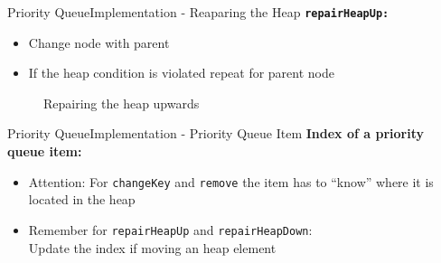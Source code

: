 \begin{frame}{Priority Queue}{Implementation - Reaparing the Heap}
  {\color{Mittel-Blau}\texttt{\textbf{repairHeapUp:}}}
  \begin{itemize}
    \item
      Change node with parent
    \item
      If the {\color{Mittel-Blau}heap condition} is violated repeat for parent
      node
  \end{itemize}
  \begin{center}
    \begin{figure}[!h]%
      \begin{columns}%
        \begin{column}{0.45\linewidth}%
          \begin{adjustbox}{width=\linewidth}%
          \end{adjustbox}%
        \end{column}%
        \begin{column}{0.45\linewidth}%
          \begin{adjustbox}{width=\linewidth}%
          \end{adjustbox}%
        \end{column}%
      \end{columns}%
      \caption{Repairing the heap upwards}%
      \label{fig:priority_queue:impl_repair_heap_up2}%
    \end{figure}
  \end{center}
\end{frame}


\begin{frame}{Priority Queue}{Implementation - Priority Queue Item}
  \textbf{Index of a priority queue item:}
  \begin{itemize}
    \item
      Attention:
      For {\color{Mittel-Blau}\texttt{changeKey}} and
      {\color{Mittel-Blau}\texttt{remove}} the item has to \enquote{know} where
      it is located in the heap
    \item
      Remember for {\color{Mittel-Blau}\texttt{repairHeapUp}} and
      {\color{Mittel-Blau}\texttt{repairHeapDown}}:\\
      Update the index if moving an heap element
  \end{itemize}
\end{frame}

